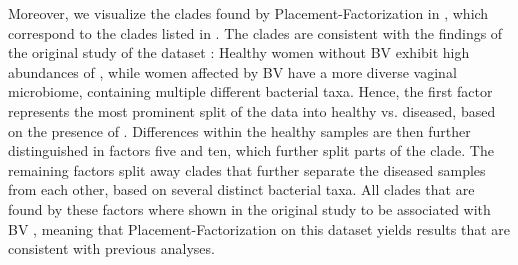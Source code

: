 Moreover, we visualize the clades found by Placement-Factorization in ,
which correspond to the clades listed in .
The clades are consistent with the findings of the original study of the dataset \cite{Srinivasan2012}:
Healthy women without \ac{BV} exhibit high abundances of ,
while women affected by \ac{BV} have a more diverse vaginal microbiome,
containing multiple different bacterial taxa.
Hence, the first factor represents the most prominent split of the data into healthy vs. diseased,
based on the presence of .
Differences within the healthy samples are then further distinguished in factors five and ten,
which further split parts of the  clade.
The remaining factors split away clades that further separate the diseased samples from each other,
based on several distinct bacterial taxa.
All clades that are found by these factors
where shown in the original study to be associated with \ac{BV} \cite{Srinivasan2012},
meaning that Placement-Factorization on this dataset yields results that are consistent with previous analyses.

